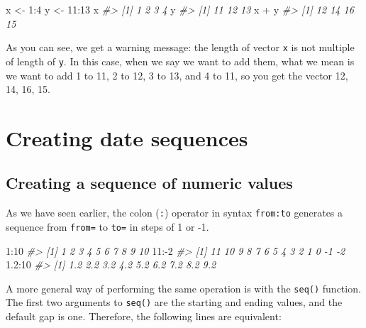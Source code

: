 \documentclass[
]{book}
\newenvironment{Shaded}{\begin{snugshade}}{\end{snugshade}}
\newcommand{\CommentTok}[1]{\textcolor[rgb]{0.56,0.35,0.01}{\textit{#1}}}
\newcommand{\DecValTok}[1]{\textcolor[rgb]{0.00,0.00,0.81}{#1}}
\newcommand{\FloatTok}[1]{\textcolor[rgb]{0.00,0.00,0.81}{#1}}
\newcommand{\NormalTok}[1]{#1}
\newcommand{\OtherTok}[1]{\textcolor[rgb]{0.56,0.35,0.01}{#1}}
\newcommand{\SpecialCharTok}[1]{\textcolor[rgb]{0.00,0.00,0.00}{#1}}
\begin{document}
\begin{Shaded}
\begin{Highlighting}[]
\NormalTok{x }\OtherTok{\textless{}{-}} \DecValTok{1}\SpecialCharTok{:}\DecValTok{4}
\NormalTok{y }\OtherTok{\textless{}{-}} \DecValTok{11}\SpecialCharTok{:}\DecValTok{13}
\NormalTok{x}
\CommentTok{\#\textgreater{} [1] 1 2 3 4}
\NormalTok{y}
\CommentTok{\#\textgreater{} [1] 11 12 13}
\NormalTok{x }\SpecialCharTok{+}\NormalTok{ y}
\CommentTok{\#\textgreater{} [1] 12 14 16 15}
\end{Highlighting}
\end{Shaded}

As you can see, we get a warning message: the length of vector \texttt{x} is not multiple of length of \texttt{y}. In this case, when we say we want to add them, what we mean is we want to add 1 to 11, 2 to 12, 3 to 13, and 4 to 11, so you get the vector 12, 14, 16, 15.

\hypertarget{creating-date-sequences}{%
\section{Creating date sequences}\label{creating-date-sequences}}

\hypertarget{creating-a-sequence-of-numeric-values}{%
\subsection{Creating a sequence of numeric values}\label{creating-a-sequence-of-numeric-values}}

As we have seen earlier, the colon (\texttt{:}) operator in syntax \texttt{from:to} generates a sequence from \texttt{from=} to \texttt{to=} in steps of 1 or -1.

\begin{Shaded}
\begin{Highlighting}[]
\DecValTok{1}\SpecialCharTok{:}\DecValTok{10}
\CommentTok{\#\textgreater{}  [1]  1  2  3  4  5  6  7  8  9 10}
\DecValTok{11}\SpecialCharTok{:{-}}\DecValTok{2}
\CommentTok{\#\textgreater{}  [1] 11 10  9  8  7  6  5  4  3  2  1  0 {-}1 {-}2}
\FloatTok{1.2}\SpecialCharTok{:}\DecValTok{10}
\CommentTok{\#\textgreater{} [1] 1.2 2.2 3.2 4.2 5.2 6.2 7.2 8.2 9.2}
\end{Highlighting}
\end{Shaded}

A more general way of performing the same operation is with the \texttt{seq()} function. The first two arguments to \texttt{seq()} are the starting and
ending values, and the default gap is one. Therefore, the following lines are equivalent:
\end{document}
